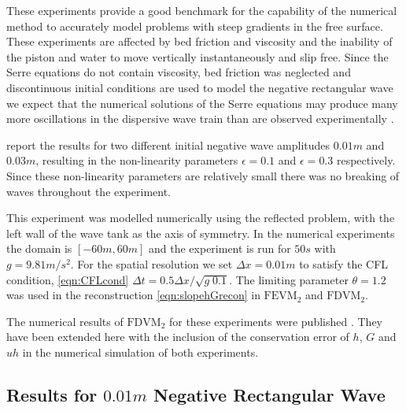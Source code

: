These experiments provide a good benchmark for the capability of the numerical method to accurately model problems with steep gradients in the free surface. These experiments are affected by bed friction and viscosity and the inability of the piston and water to move vertically instantaneously and slip free. Since the Serre equations do not contain viscosity, bed friction was neglected and discontinuous initial conditions are used to model the negative rectangular wave we expect that the numerical solutions of the Serre equations may produce many more oscillations in the dispersive wave train than are observed experimentally \cite{Pitt-2018-61}.

\citet{Hammack-Segur-1978-337} report the results for two different initial negative wave amplitudes $0.01m$ and $0.03m$, resulting in the non-linearity parameters $\epsilon = 0.1$ and $\epsilon=0.3$ respectively. Since these non-linearity parameters are relatively small there was no breaking of waves throughout the experiment.

This experiment was modelled numerically using the reflected problem, with the left wall of the wave tank as the axis of symmetry. In the numerical experiments the domain is $[-60m,60m]$ and the experiment is run for $ 50s$ with $g = 9.81m/s^2$. For the spatial resolution we set $\Delta x = 0.01m$ to satisfy the CFL condition, \eqref{eqn:CFLcond} $\Delta t = 0.5 \Delta x / \sqrt{g \; 0.1}$. The limiting parameter $\theta = 1.2$ was used in the reconstruction \eqref{eqn:slopehGrecon} in $\text{FEVM}_2$ and $\text{FDVM}_2$.

The numerical results of $\text{FDVM}_2$ for these experiments were published \cite{Zoppou-etal-2017}. They have been extended here with the inclusion of the conservation error of $h$, $G$ and $uh$ in the numerical simulation of both experiments.

\subsection{Results for $0.01m$ Negative Rectangular Wave}

